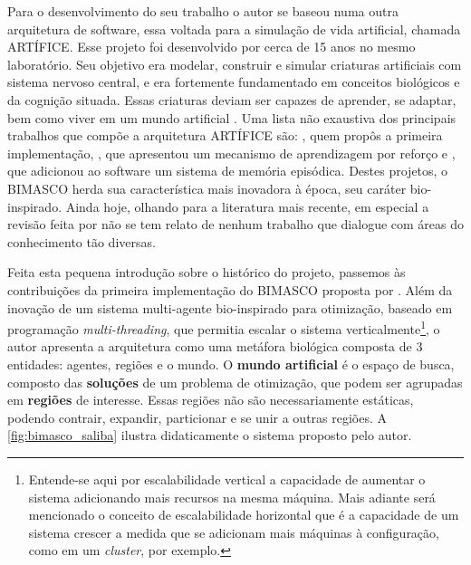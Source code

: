 Para o desenvolvimento do seu trabalho o autor se baseou numa outra arquitetura de software, essa voltada para a simulação de vida artificial, chamada ARTÍFICE. Esse projeto foi desenvolvido por cerca de 15 anos no mesmo laboratório. Seu objetivo era modelar, construir e simular criaturas artificiais com sistema nervoso central, e era fortemente fundamentado em conceitos biológicos e da cognição situada. Essas criaturas deviam ser capazes de aprender, se adaptar, bem como viver em um mundo artificial \cite{santos2003}. Uma lista não exaustiva dos principais trabalhos que compõe a arquitetura ARTÍFICE são: , quem propôs a primeira implementação, , que apresentou um mecanismo de aprendizagem por reforço e , que adicionou ao software um sistema de memória episódica. 
Destes projetos, o BIMASCO herda sua característica mais inovadora à época, seu caráter bio-inspirado. Ainda hoje, olhando para a literatura mais recente, em especial a revisão feita por  não se tem relato de nenhum trabalho que dialogue com áreas do conhecimento tão diversas. 

Feita esta pequena introdução sobre o histórico do projeto, passemos às contribuições da primeira implementação do BIMASCO proposta por . Além da inovação de um sistema multi-agente bio-inspirado para otimização, baseado em programação \textit{multi-threading}, que permitia escalar o sistema verticalmente\footnote{Entende-se aqui por escalabilidade vertical a capacidade de aumentar o sistema adicionando mais recursos na mesma máquina. Mais adiante será mencionado o conceito de escalabilidade horizontal que é a capacidade de um sistema crescer a medida que se adicionam mais máquinas à configuração, como em um \textit{cluster}, por exemplo.}, o autor apresenta a arquitetura como uma metáfora biológica composta de 3 entidades: agentes, regiões e o mundo. O \textbf{mundo artificial} é o espaço de busca, composto das \textbf{soluções} de um problema de otimização, que podem ser agrupadas em \textbf{regiões} de interesse. Essas regiões não são necessariamente estáticas, podendo contrair, expandir, particionar e se unir a outras regiões. A \autoref{fig:bimasco_saliba} ilustra didaticamente o sistema proposto pelo autor. 

